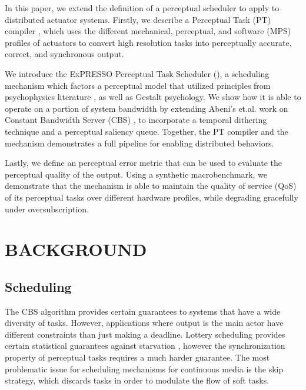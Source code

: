 \documentclass{sigchi}
\newcommand{\expresso}{ExPRESSO }
\newcommand*{\schedule}[1]{{\textbf{\small{\fontfamily{cmss}\selectfont{#1}}}}}
\begin{document}
In this paper, we extend the definition of a perceptual scheduler \cite{chaudhary_perceptual_2001} to apply to distributed actuator systems. Firstly, we describe a Perceptual Task (PT) compiler , which uses the different mechanical, perceptual, and software (MPS) profiles of actuators to convert high resolution tasks into perceptually accurate, correct, and synchronous output. 

We introduce the \expresso Perceptual Task Scheduler (\schedule{PTS}), a scheduling mechanism which factors a perceptual model that utilized principles from psychophysics literature \cite{pelli_psychophysical_1995}, as well as Gestalt psychology. We show how it is able to operate on a portion of system bandwidth by extending Abeni's et.al. work on Constant Bandwidth Server (CBS) \cite{abeni_integrating_1998}, to incorporate a temporal dithering technique and a perceptual saliency queue. Together, the PT compiler and the \schedule{PTS} mechanism demonstrates a full pipeline for enabling distributed behaviors. 

Lastly, we define an perceptual error metric that can be used to evaluate the perceptual quality of the output. Using a synthetic macrobenchmark, we demonstrate that the \schedule{PTS} mechanism is able to maintain the quality of service (QoS) of its perceptual tasks over different hardware profiles, while degrading gracefully under oversubscription. 

\section{BACKGROUND}

  \subsection{Scheduling}
  The CBS algorithm \cite{abeni_integrating_1998} provides certain guarantees to systems that have a wide diversity of tasks. However, applications where output is the main actor have different constraints than just making a deadline.  Lottery scheduling provides certain statistical guarantees against starvation \cite{waldspurger_lottery_1994}, however the synchronization property of perceptual tasks requires a much harder guarantee. The most problematic issue for scheduling mechanisms for continuous media is the skip strategy, which discards tasks in order to modulate the flow of soft tasks. 

\end{document}
